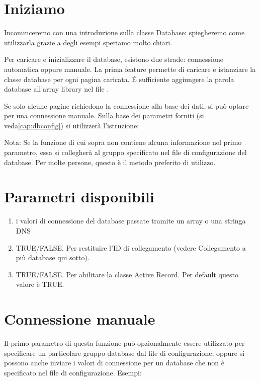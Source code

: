\section*{Iniziamo}
Incominceremo con una introduzione sulla classe Database: spiegheremo come utilizzarla grazie a degli esempi speriamo molto chiari.

Per caricare e inizializzare il database, esistono due strade: connessione automatica oppure manuale. La prima feature permette di caricare e istanziare la classe database per ogni pagina caricata. \'E sufficiente aggiungere la parola database all'array library nel file .

Se solo alcune pagine richiedono la connessione alla base dei dati, si può optare per una connessione manuale. Sulla base dei parametri forniti (si veda\vref{cap:dbconfig}) si utilizzerà l'istruzione:


Nota: Se la funzione di cui sopra non contiene alcuna informazione nel primo parametro, essa si collegherà al gruppo specificato nel file di configurazione del database. Per molte persone, questo è il metodo preferito di utilizzo.

\section*{Parametri disponibili}
\begin{enumerate}
\item i valori di connessione del database passate tramite un array o una stringa \ac{DNS}
\item TRUE/FALSE. Per restituire l'ID di collegamento (vedere Collegamento a più database qui sotto).
\item TRUE/FALSE. Per abilitare la classe Active Record. Per default questo valore è TRUE.
\end{enumerate}

\section*{Connessione manuale}
Il primo parametro di questa funzione può opzionalmente essere utilizzato per specificare un particolare gruppo database dal file di configurazione, oppure si possono anche inviare i valori di connessione per un database che non è specificato nel file di configurazione. Esempi:

